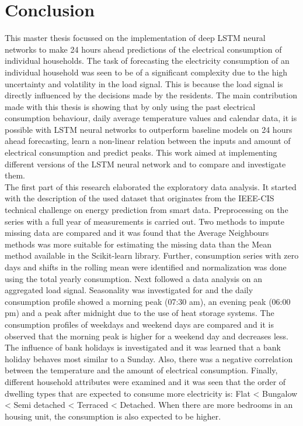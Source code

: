 \chapter{Conclusion}
\label{cha:conclusion}
This master thesis focussed on the implementation of deep LSTM neural networks to make 24 hours ahead predictions of the electrical consumption of individual households. The task of forecasting the electricity consumption of an individual household was seen to be of a significant complexity due to the high uncertainty and volatility in the load signal. This is because the load signal is directly influenced by the decisions made by the residents. The main contribution made with this thesis is showing that by only using the past electrical consumption behaviour, daily average temperature values and calendar data, it is possible with LSTM neural networks to outperform baseline models on 24 hours ahead forecasting, learn a non-linear relation between the inputs and amount of electrical consumption and predict peaks. This work aimed at implementing different versions of the LSTM neural network and to compare and investigate them.\\

The first part of this research elaborated the exploratory data analysis. It started with the description of the used dataset that originates from the IEEE-CIS technical challenge on energy prediction from smart data. Preprocessing on the series with a full year of measurements is carried out. Two methods to impute missing data are compared and it was found that the Average Neighbours methods was more suitable for estimating the missing data than the Mean method available in the Scikit-learn library. Further, consumption series with zero days and shifts in the rolling mean were identified and normalization was done using the total yearly consumption. Next followed a data analysis on an aggregated load signal. Seasonality was investigated for and the daily consumption profile showed a morning peak (07:30 am), an evening peak (06:00 pm) and a peak after midnight due to the use of heat storage systems. The consumption profiles of weekdays and weekend days are compared and it is observed that the morning peak is higher for a weekend day and decreases less. The influence of bank holidays is investigated and it was learned that a bank holiday behaves most similar to a Sunday. Also, there was a negative correlation between the temperature and the amount of electrical consumption. Finally, different household attributes were examined and it was seen that the order of dwelling types that are expected to consume more electricity is: Flat < Bungalow < Semi detached < Terraced < Detached. When there are more bedrooms in an housing unit, the consumption is also expected to be higher. \\ 

